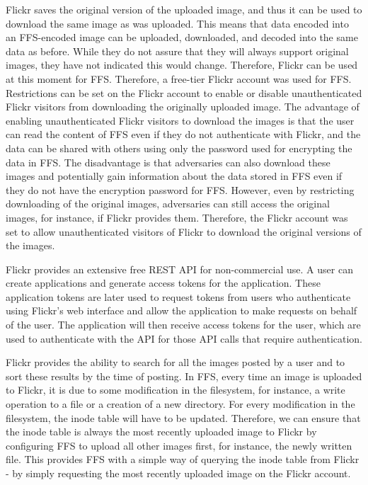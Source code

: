 Flickr saves the original version of the uploaded image, and thus it can be used to download the same image as was uploaded. This means that data encoded into an \mbox{\gls{FFS}-encoded} image can be uploaded, downloaded, and decoded into the same data as before. While they do not assure that they will always support original images, they have not indicated this would change. Therefore, Flickr can be used at this moment for \gls{FFS}. Therefore, a \mbox{free-tier} Flickr account was used for \gls{FFS}. Restrictions can be set on the Flickr account to enable or disable unauthenticated Flickr visitors from downloading the originally uploaded image. The advantage of enabling unauthenticated Flickr visitors to download the images is that the user can read the content of \gls{FFS} even if they do not authenticate with Flickr, and the data can be shared with others using only the password used for encrypting the data in \gls{FFS}. The disadvantage is that adversaries can also download these images and potentially gain information about the data stored in \gls{FFS} even if they do not have the encryption password for \gls{FFS}. However, even by restricting downloading of the original images, adversaries can still access the original images, for instance, if Flickr provides them. Therefore, the Flickr account was set to allow unauthenticated visitors of Flickr to download the original versions of the images.

Flickr provides an extensive free REST \gls{API} for \mbox{non-commercial} use. A user can create applications and generate access tokens for the application. These application tokens are later used to request tokens from users who authenticate using Flickr's web interface and allow the application to make requests on behalf of the user. The application will then receive access tokens for the user, which are used to authenticate with the \gls{API} for those \gls{API} calls that require authentication.

Flickr provides the ability to search for all the images posted by a user and to sort these results by the time of posting. In \gls{FFS}, every time an image is uploaded to Flickr, it is due to some modification in the filesystem, for instance, a write operation to a file or a creation of a new directory. For every modification in the filesystem, the inode table will have to be updated. Therefore, we can ensure that the inode table is always the most recently uploaded image to Flickr by configuring \gls{FFS} to upload all other images first, for instance, the newly written file. This provides \gls{FFS} with a simple way of querying the inode table from Flickr - by simply requesting the most recently uploaded image on the Flickr account.


